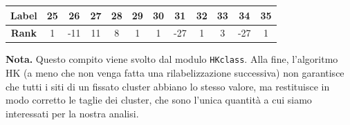 \vspace{10px}
\noindent
\begin{tabular}{|c|*{11}{c|}}
	\hline
	\textbf{Label} & 25 & 26 & 27 & 28 & 29 & 30 & 31 & 32 & 33 & 34 & 35 \\
	\hline
	\textbf{Rank} & 1 & -11 & 11 & 8 & 1 & 1 & -27 & 1 & 3 & -27 & 1 \\
	\hline
\end{tabular}

\vspace{15px}
\noindent
\textbf{Nota.} Questo compito viene svolto dal modulo \texttt{HKclass}.
\newline\newline
Alla fine, l’algoritmo HK (a meno che non venga fatta una rilabelizzazione successiva) non garantisce che tutti i siti di un fissato cluster abbiano lo stesso valore, ma restituisce in modo corretto le taglie dei cluster, che sono l’unica quantità a cui siamo interessati per la nostra analisi.